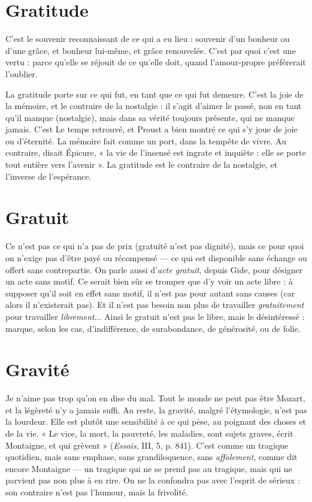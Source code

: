 \section{Gratitude}
C'est le souvenir reconnaissant de ce qui a eu lieu : souvenir
d’un bonheur ou d’une grâce, et bonheur lui-même, et grâce
renouvelée. C’est par quoi c’est une vertu : parce qu’elle se réjouit de ce qu’elle
doit, quand l’amour-propre préférerait l'oublier.

La gratitude porte sur ce qui fut, en tant que ce qui fut demeure. C’est la
joie de la mémoire, et le contraire de la nostalgie : il s’agit d’aimer le passé, non
en tant qu’il manque (nostalgie), mais dans sa vérité toujours présente, qui ne
manque jamais. C’est Le temps retrouvé, et Proust a bien montré ce qui s’y joue
de joie ou d’éternité. La mémoire fait comme un port, dans la tempête de vivre.
Au contraire, disait Épicure, « la vie de l’insensé est ingrate et inquiète : elle se
porte tout entière vers l'avenir ». La gratitude est le contraire de la nostalgie, et
l'inverse de l’espérance.

\section{Gratuit}
Ce n’est pas ce qui n’a pas de prix (gratuité n’est pas dignité),
mais ce pour quoi on n’exige pas d’être payé ou récompensé — ce
qui est disponible sans échange ou offert sans contrepartie. On parle aussi
d’{\it acte gratuit}, depuis Gide, pour désigner un acte sans motif. Ce serait bien sûr
se tromper que d’y voir un acte libre : à supposer qu’il soit en effet sans motif,
il n’est pas pour autant sans causes (car alors il n’existerait pas). Et il n’est pas
besoin non plus de travailler {\it gratuitement} pour travailler {\it librement}... Ainsi le
gratuit n’est pas le libre, mais le désintéressé : marque, selon les cas, d’indifférence,
de surabondance, de générosité, ou de folie.

\section{Gravité}
Je n’aime pas trop qu’on en dise du mal. Tout le monde ne peut
pas être Mozart, et la légèreté n’y a jamais suffi. Au reste, la gravité,
malgré l’étymologie, n’est pas la lourdeur. Elle est plutôt une sensibilité à
ce qui pèse, au poignant des choses et de la vie. « Le vice, la mort, la pauvreté,
les maladies, sont sujets graves, écrit Montaigne, et qui grèvent » ({\it Essais}, III, 5,
p. 841). C’est comme un tragique quotidien, mais sans emphase, sans grandiloquence,
sans {\it affolement}, comme dit encore Montaigne — un tragique qui ne
se prend pas au tragique, mais qui ne parvient pas non plus à en rire. On ne la
confondra pas avec l’esprit de sérieux : son contraire n’est pas l'humour, mais
la frivolité.

